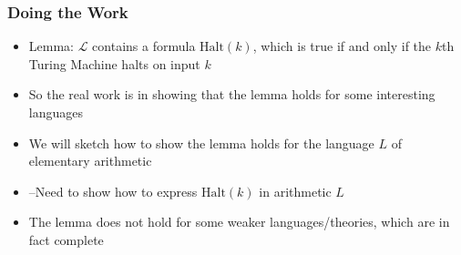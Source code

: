 \begin{frame}
\frametitle{Doing the Work}

\begin{itemize}[<+->]

\item Lemma: $\mathcal{L}$ contains a formula \(\mbox{Halt}(k)\), which is true if and only if the $k$th Turing Machine halts on input \(k\)

\item So the real work is in showing that the lemma holds for some interesting languages



\item We will sketch how to show the lemma holds for the language $L$ of elementary arithmetic

\item[] --Need to show how to express \(\mbox{Halt}(k)\) in arithmetic $L$

\item The lemma does not hold for some weaker languages/theories, which are in fact complete

\end{itemize}
\end{frame}

\fi 

